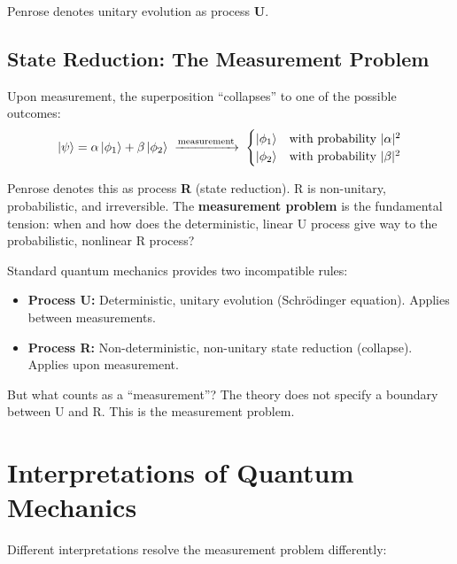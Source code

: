 \documentclass[11pt,a4paper]{report}
\begin{document}
Penrose denotes unitary evolution as process \textbf{U}.

\subsection{State Reduction: The Measurement Problem}

Upon measurement, the superposition ``collapses'' to one of the possible outcomes:
\[
  \ket{\psi} = \alpha\ket{\phi_1} + \beta\ket{\phi_2} \;\xrightarrow{\text{measurement}}\; \begin{cases} \ket{\phi_1} & \text{with probability } |\alpha|^2 \\ \ket{\phi_2} & \text{with probability } |\beta|^2 \end{cases}
\]

Penrose denotes this as process \textbf{R} (state reduction). R is non-unitary, probabilistic, and irreversible. The \textbf{measurement problem} is the fundamental tension: when and how does the deterministic, linear U process give way to the probabilistic, nonlinear R process?

\begin{definitionbox}
Standard quantum mechanics provides two incompatible rules:
\begin{itemize}[leftmargin=1.5em]
  \item \textbf{Process U:} Deterministic, unitary evolution (Schr\"odinger equation). Applies between measurements.
  \item \textbf{Process R:} Non-deterministic, non-unitary state reduction (collapse). Applies upon measurement.
\end{itemize}
But what counts as a ``measurement''? The theory does not specify a boundary between U and R. This is the measurement problem.
\end{definitionbox}

\section{Interpretations of Quantum Mechanics}

Different interpretations resolve the measurement problem differently:
\end{document}
